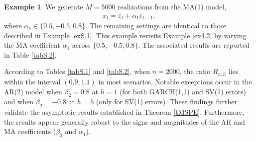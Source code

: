 \documentclass[ejsv2]{imsart}
\theoremstyle{plain}
\theoremstyle{definition}
\newtheorem{example}{Example}[section]
\theoremstyle{remark}
\begin{document}
\begin{example}\label{exS.2}
We generate $M=5000$ realizations from
the MA(1) model,
\begin{eqnarray*}
x_t=\varepsilon_t+\alpha_1\varepsilon_{t-1},
\end{eqnarray*}
where $\alpha_1 \in \{0.5, -0.5, 0.8\}$. The remaining settings are identical to those described in Example \ref{exS.1}. This example revisits Example \ref{ex4.2} by varying the MA coefficient $\alpha_1$ across $\{0.5, -0.5, 0.8\}$. The associated results are reported in Table \ref{tabS.2}.
\end{example}

According to Tables \ref{tabS.1} and \ref{tabS.2}, when $n=2000$, the ratio $R_{n,h}$ lies within the interval $(0.9, 1.1)$ in most scenarios. 
Notable exceptions occur in the AR(2) model when $\beta_2=0.8$ at $h=1$ (for both GARCH(1,1) and SV(1) errors) and when $\beta_2=-0.8$ at $h=5$ (only for SV(1) errors). These findings further validate the asymptotic results established in Theorem \ref{tMSPE}. Furthermore, the results appear generally robust to the signs and magnitudes of the AR and MA coefficients ($\beta_2$ and $\alpha_1$).
\end{document}
